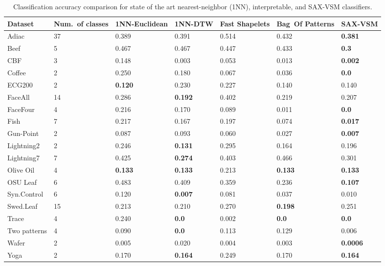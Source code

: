 \begin{table}[t!]
\captionsetup{justification=centering}
\caption{Classification accuracy comparison for state of the art nearest-neighbor (1NN), interpretable, and \mbox{SAX-VSM} classifiers.}
 \label{perf_table1}
{\setlength{\extrarowheight}{1.5pt}%
{\footnotesize
\begin{tabularx}{\linewidth}{@{} l *6X @{}}
\hline
Dataset & \mbox{Num. of} classes & 1NN-Euclidean & 1NN-DTW & Fast Shapelets &  \mbox{Bag Of} \mbox{Patterns}
& SAX-VSM\\
\hline
Adiac        &37  & 0.389   & 0.391  & 0.514  & 0.432  & \textbf{0.381}\\
Beef         &5   & 0.467   & 0.467  & 0.447  & 0.433 & \textbf{0.3}\\
CBF         & 3  & 0.148    & 0.003  & 0.053    & 0.013 & \textbf{0.002} \\
Coffee       &2    & 0.250   & 0.180  & 0.067     & 0.036     & \textbf{0.0} \\
ECG200     &2   & \textbf{0.120}  & 0.230  & 0.227     & 0.140   & 0.140 \\
FaceAll      &14  & 0.286   & \textbf{0.192}  & 0.402     & 0.219   & 0.207\\
FaceFour    &4   & 0.216   & 0.170  & 0.089     & 0.011   & \textbf{0.0} \\
Fish         &7   & 0.217   & 0.167  & 0.197    & 0.074   & \textbf{0.017} \\
Gun-Point    &2   & 0.087   & 0.093  & 0.060     & 0.027     & \textbf{0.007} \\
Lightning2    &2   & 0.246   & \textbf{0.131}  & 0.295  & 0.164  & 0.196 \\
Lightning7    &7   & 0.425   & \textbf{0.274}  & 0.403  & 0.466  & 0.301 \\
Olive Oil     &4   & \textbf{0.133}   & \textbf{0.133}  & 0.213     & \textbf{0.133}  & \textbf{0.133}\\
OSU Leaf    &6   & 0.483   & 0.409  & 0.359     & 0.236  & \textbf{0.107} \\
Syn.Control  &6   & 0.120   & \textbf{0.007}  & 0.081     & 0.037  & 0.010 \\
Swed.Leaf   &15  & 0.213   & 0.210 & 0.270 & \textbf{0.198} & 0.251 \\
Trace       &4   & 0.240   & \textbf{0.0}    & 0.002  & \textbf{0.0} & \textbf{0.0} \\
Two patterns &4   & 0.090   & \textbf{0.0}    & 0.113   & 0.129      & 0.006 \\
Wafer        &2    & 0.005   & 0.020     & 0.004  & 0.003 & \textbf{0.0006} \\
Yoga        &2    & 0.170   & \textbf{0.164}  & 0.249 & 0.170 & \textbf{0.164} \\
\hline
\end{tabularx}
}}
\end{table}

